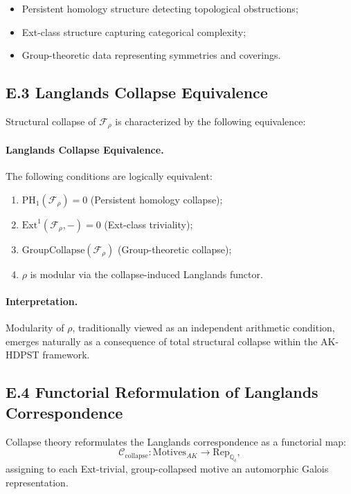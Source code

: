 \documentclass[11pt]{article}
\begin{document}
\begin{itemize}
    \item Persistent homology structure detecting topological obstructions;
    \item Ext-class structure capturing categorical complexity;
    \item Group-theoretic data representing symmetries and coverings.
\end{itemize}

\subsection*{E.3 Langlands Collapse Equivalence}

Structural collapse of $\mathcal{F}_\rho$ is characterized by the following equivalence:

\paragraph{Langlands Collapse Equivalence.}  
The following conditions are logically equivalent:
\begin{enumerate}
    \item $\mathrm{PH}_1(\mathcal{F}_\rho) = 0$ \quad (Persistent homology collapse);
    \item $\mathrm{Ext}^1(\mathcal{F}_\rho, -) = 0$ \quad (Ext-class triviality);
    \item $\mathrm{GroupCollapse}(\mathcal{F}_\rho)$ \quad (Group-theoretic collapse);
    \item $\rho$ is modular via the collapse-induced Langlands functor.
\end{enumerate}

\paragraph{Interpretation.}  
Modularity of $\rho$, traditionally viewed as an independent arithmetic condition, emerges naturally as a consequence of total structural collapse within the AK-HDPST framework.

\subsection*{E.4 Functorial Reformulation of Langlands Correspondence}

Collapse theory reformulates the Langlands correspondence as a functorial map:
\[
\mathcal{C}_{\mathrm{collapse}} : \mathrm{Motives}_{AK} \longrightarrow \mathrm{Rep}_{\mathbb{Q}_\ell},
\]
assigning to each Ext-trivial, group-collapsed motive an automorphic Galois representation.
\end{document}
